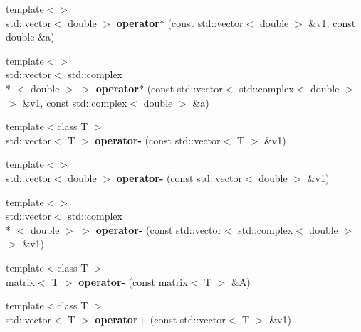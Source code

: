 \begin{DoxyCompactItemize}
\item 
\hypertarget{namespacekeycpp_a2dec8480e0274e4e6a2659f8a8f3e942}{{\footnotesize template$<$$>$ }\\std\-::vector$<$ double $>$ {\bfseries operator$\ast$} (const std\-::vector$<$ double $>$ \&v1, const double \&a)}\label{namespacekeycpp_a2dec8480e0274e4e6a2659f8a8f3e942}

\item 
\hypertarget{namespacekeycpp_a30b05b16a4e69d253281e8568c101e16}{{\footnotesize template$<$$>$ }\\std\-::vector$<$ std\-::complex\\*
$<$ double $>$ $>$ {\bfseries operator$\ast$} (const std\-::vector$<$ std\-::complex$<$ double $>$$>$ \&v1, const std\-::complex$<$ double $>$ \&a)}\label{namespacekeycpp_a30b05b16a4e69d253281e8568c101e16}

\item 
\hypertarget{namespacekeycpp_ac2665554c04ea23aad98e77d1618ca6b}{{\footnotesize template$<$class T $>$ }\\std\-::vector$<$ T $>$ {\bfseries operator-\/} (const std\-::vector$<$ T $>$ \&v1)}\label{namespacekeycpp_ac2665554c04ea23aad98e77d1618ca6b}

\item 
\hypertarget{namespacekeycpp_adad4206f801320c785980b9ed743e2da}{{\footnotesize template$<$$>$ }\\std\-::vector$<$ double $>$ {\bfseries operator-\/} (const std\-::vector$<$ double $>$ \&v1)}\label{namespacekeycpp_adad4206f801320c785980b9ed743e2da}

\item 
\hypertarget{namespacekeycpp_a2184c8432cf367ca33a284adec8ac68c}{{\footnotesize template$<$$>$ }\\std\-::vector$<$ std\-::complex\\*
$<$ double $>$ $>$ {\bfseries operator-\/} (const std\-::vector$<$ std\-::complex$<$ double $>$$>$ \&v1)}\label{namespacekeycpp_a2184c8432cf367ca33a284adec8ac68c}

\item 
\hypertarget{namespacekeycpp_a390125160a7febd08d5c30629f4f698f}{{\footnotesize template$<$class T $>$ }\\\hyperlink{classkeycpp_1_1matrix}{matrix}$<$ T $>$ {\bfseries operator-\/} (const \hyperlink{classkeycpp_1_1matrix}{matrix}$<$ T $>$ \&A)}\label{namespacekeycpp_a390125160a7febd08d5c30629f4f698f}

\item 
\hypertarget{namespacekeycpp_a7825f94b7be431bab5e5c99f8d7a1b54}{{\footnotesize template$<$class T $>$ }\\std\-::vector$<$ T $>$ {\bfseries operator+} (const std\-::vector$<$ T $>$ \&v1)}\label{namespacekeycpp_a7825f94b7be431bab5e5c99f8d7a1b54}


\end{DoxyCompactItemize}
